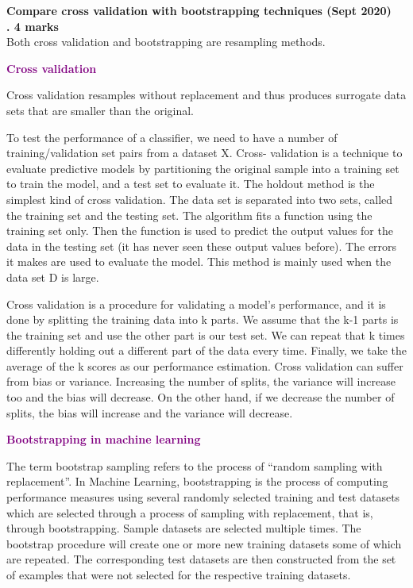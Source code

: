 
\textbf{\textcolor{LightMagenta}{Compare cross validation with bootstrapping techniques  (Sept 2020) \\ . \hfill 4 marks}}
\\[5pt]

Both cross validation and bootstrapping are resampling methods.

\textbf{\textcolor{purple}{Cross validation}}

Cross validation resamples without replacement and thus produces surrogate data sets that are smaller than the original.

To test the performance of a classifier, we need to have a number of training/validation set pairs from a dataset X. Cross- validation is a technique to evaluate predictive models by partitioning the original sample into a training set to train the model, and a test set to evaluate it. The holdout method is the simplest kind of cross validation. The data set is separated into two sets, called the training set and the testing set. The algorithm
fits a function using the training set only.
Then the function is used to predict the output values for the data in the testing set (it has never seen these output values before). The errors it makes are used to evaluate the
model. This method is mainly used when the data set D is large.

Cross validation is a procedure for validating a model's performance, and it is done by splitting the training data into k parts. We assume that the k-1 parts is the training set and use the other part is our test set. We can repeat that k times differently holding out a different part of the data every time. Finally, we take the average of the k scores as our performance estimation. Cross validation can suffer from bias or variance. Increasing the number of splits, the variance will increase too and the bias will decrease. On the other hand, if we decrease the number of splits, the bias will increase and the variance will decrease.


\textbf{\textcolor{purple}{Bootstrapping in machine learning}}

The term bootstrap sampling refers to the process of “random sampling with replacement”. 
In Machine Learning, bootstrapping is the process of computing performance measures using several randomly selected training and test datasets which are selected through a process of sampling with replacement, that is, through bootstrapping. Sample datasets are selected multiple times. The bootstrap procedure will create one or more new training datasets some of which are repeated. The corresponding test datasets are then constructed from the set of examples that were not selected for the respective training datasets.
